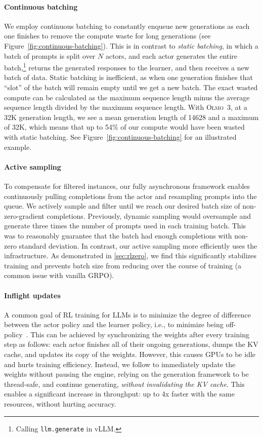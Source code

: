 \documentclass[table]{ai2style/ai2}
\newcommand{\newOlmo}{Olmo\xspace}
\newcommand{\olmothree}{\textsc{\newOlmo~3}\xspace}
\begin{document}
\paragraph{Continuous batching}{We employ continuous batching to constantly enqueue new generations as each one finishes to remove the compute waste for long generations (see Figure~\ref{fig:continuous-batching}).
    This is in contrast to {\it static batching}, in which a batch of prompts is split over $N$ actors, and each actor generates the entire batch,\footnote{Calling \texttt{llm.generate} in vLLM.} returns the generated responses to the learner, and then receives a new batch of data.
    Static batching is inefficient, as when one generation finishes that ``slot'' of the batch will remain empty until we get a new batch.
    The exact wasted compute can be calculated as the maximum sequence length minus the average sequence length divided by the maximum sequence length.
    With \olmothree, at a 32K generation length, we see a mean generation length of 14628 and a maximum of 32K, which means that up to 54\% of our compute would have been wasted with static batching.
    See Figure~\ref{fig:continuous-batching} for an illustrated example. 

\paragraph{Active sampling}{To compensate for filtered instances, our fully asynchronous framework enables continuously pulling completions from the actor and resampling prompts into the queue. We actively sample and filter until we reach our desired batch size of non-zero-gradient completions. Previously, \citet{yu2025dapo} dynamic sampling would oversample and generate three times the number of prompts used in each training batch. This was to reasonably guarantee that the batch had enough completions with non-zero standard deviation. In contrast, our active sampling more efficiently uses the infrastructure. As demonstrated in \autoref{sec:rlzero}, we find this significantly stabilizes training and prevents batch size from reducing over the course of training (a common issue with vanilla GRPO).

\paragraph{Inflight updates}{
A common goal of RL training for LLMs is to minimize the degree of difference between the actor policy and the learner policy, i.e., to minimize being off-policy~\citep{deadly-triad}.
This can be achieved by synchronizing the weights after every training step as follows: each actor finishes all of their ongoing generations, dumps the KV cache, and updates its copy of the weights. However, this causes GPUs to be idle and hurts training efficiency.
Instead, we follow \citet{pipelinerl} to immediately update the weights without pausing the engine, relying on the generation framework to be thread-safe, and continue generating, \emph{without invalidating the KV cache}.
This enables a significant increase in throughput: up to 4x faster with the same resources, without hurting accuracy.}

}}
\end{document}
